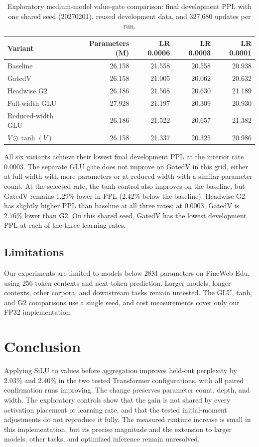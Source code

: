 \documentclass[11pt,a4paper]{article}
\begin{document}
\begin{table}[htbp]
\centering\small
\caption{Exploratory medium-model value-gate comparison: final development PPL with one shared seed (20270201), reused development data, and 327,680 updates per run.}
\label{tab:value_gates}
\begin{tabular}{lrrrr}
\toprule
Variant & Parameters (M) & LR 0.0006 & LR 0.0003 & LR 0.0001\\
\midrule
Baseline & 26.158 & 21.558 & 20.558 & 20.938\\
GatedV & 26.158 & 21.005 & 20.062 & 20.632\\
Headwise G2 & 26.186 & 21.568 & 20.630 & 21.189\\
Full-width GLU & 27.928 & 21.197 & 20.309 & 20.930\\
Reduced-width GLU & 26.186 & 21.522 & 20.657 & 21.382\\
$V\odot\tanh(V)$ & 26.158 & 21.337 & 20.325 & 20.986\\
\bottomrule
\end{tabular}
\end{table}

All six variants achieve their lowest final development PPL at the interior rate 0.0003. The separate GLU gate does not improve on GatedV in this grid, either at full width with more parameters or at reduced width with a similar parameter count. At the selected rate, the tanh control also improves on the baseline, but GatedV remains 1.29\% lower in PPL (2.42\% below the baseline). Headwise G2 has slightly higher PPL than baseline at all three rates; at 0.0003, GatedV is 2.76\% lower than G2. On this shared seed, GatedV has the lowest development PPL at each of the three learning rates.

\subsection{Limitations}
\label{sec:limitations}
Our experiments are limited to models below 28M parameters on FineWeb-Edu, using 256-token contexts and next-token prediction. Larger models, longer contexts, other corpora, and downstream tasks remain untested. The GLU, tanh, and G2 comparisons use a single seed, and cost measurements cover only our FP32 implementation.

\section{Conclusion}
\label{sec:conclusion}
Applying SiLU to values before aggregation improves held-out perplexity by 2.03\% and 2.40\% in the two tested Transformer configurations, with all paired confirmation runs improving. The change preserves parameter count, depth, and width. The exploratory controls show that the gain is not shared by every activation placement or learning rate, and that the tested initial-moment adjustments do not reproduce it fully. The measured runtime increase is small in this implementation, but its precise magnitude and the extension to larger models, other tasks, and optimized inference remain unresolved.
\end{document}
